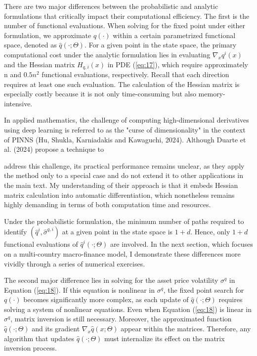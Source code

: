 \documentclass{article}
\begin{document}
There are two major differences between the probabilistic and analytic formulations that critically impact their computational efficiency. The first is the number of functional evaluations. When solving for the fixed point under either formulation, we approximate $q(\cdot)$ within a certain parametrized functional space, denoted as $\hat{q}(\cdot;\Theta)$. For a given point in the state space, the primary computational cost under the analytic formulation lies in evaluating $\nabla_{x}q^{i}(x)$ and the Hessian matrix $H_{q,i}(x)$ in PDE (\ref{eq:17}), which require approximately n and $0.5n^{2}$ functional evaluations, respectively. Recall that each direction requires at least one such evaluation. The calculation of the Hessian matrix is especially costly because it is not only time-consuming but also memory-intensive.

In applied mathematics, the challenge of computing high-dimensional derivatives using deep learning is referred to as the "curse of dimensionality" in the context of PINNS (Hu, Shukla, Karniadakis and Kawaguchi, 2024). Although Duarte et al. (2024) propose a technique to

\clearpage

address this challenge, its practical performance remains unclear, as they apply the method only to a special case and do not extend it to other applications in the main text. My understanding of their approach is that it embeds Hessian matrix calculation into automatic differentiation, which nonetheless remains highly demanding in terms of both computation time and resources.

Under the probabilistic formulation, the minimum number of paths required to identify $(\hat{q}^{i},\hat{\sigma}^{q,i})$ at a given point in the state space is $1+d$. Hence, only $1+d$ functional evaluations of $\hat{q}^{i}(\cdot;\Theta)$ are involved. In the next section, which focuses on a multi-country macro-finance model, I demonstrate these differences more vividly through a series of numerical exercises.

The second major difference lies in solving for the asset price volatility $\sigma^{q}$ in Equation (\ref{eq:18}). If this equation is nonlinear in $\sigma^{q}$, the fixed point search for $q(\cdot)$ becomes significantly more complex, as each update of $\hat{q}(\cdot;\Theta)$ requires solving a system of nonlinear equations. Even when Equation (\ref{eq:18}) is linear in $\sigma^{q}$, matrix inversion is still necessary. Moreover, the approximated function $\hat{q}(\cdot;\Theta)$ and its gradient $\nabla_{x}\hat{q}(x;\Theta)$ appear within the matrices. Therefore, any algorithm that updates $\hat{q}(\cdot;\Theta)$ must internalize its effect on the matrix inversion process.
\end{document}
